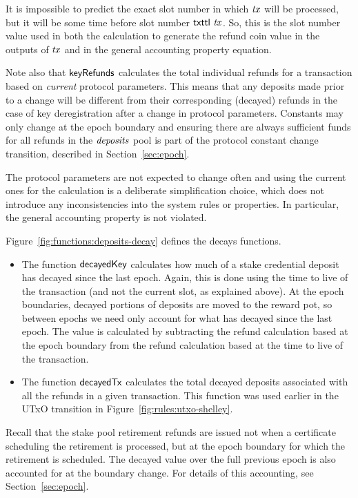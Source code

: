 \begin{itemize}
    It is impossible to predict the exact slot number in which $\mathit{tx}$ will be processed,
    but it will be some time before slot number $\mathsf{txttl}~\mathit{tx}$. So, this is the slot
    number value used in both the calculation to generate the refund coin value in the outputs
    of $\mathit{tx}$ and in the general accounting property equation.

    Note also that
    $\mathsf{keyRefunds}$ calculates the total individual refunds for a transaction
    based on \textit{current} protocol parameters. This means that any deposits
    made prior to a change will be different from their corresponding
    (decayed) refunds in the case of key deregistration after a change in
    protocol parameters. Constants may only change at the epoch boundary and
    ensuring there are always sufficient funds for all
    refunds in the $\mathit{deposits}$ pool is part of the protocol constant
    change transition, described in Section~\ref{sec:epoch}.

    The protocol parameters are not
    expected to change often and using the current ones for the calculation
    is a deliberate simplification choice, which does not introduce any inconsistencies
    into the system rules or properties. In particular, the general accounting
    property is not violated.
\end{itemize}
Figure~\ref{fig:functions:deposits-decay} defines the decays functions.
\begin{itemize}

\item The function $\mathsf{decayedKey}$ calculates how much of a stake credential
  deposit has decayed since the last epoch. Again, this is done using the time
  to live of the transaction (and not the current slot, as explained above).  At
  the epoch boundaries, decayed portions of deposits are moved to the reward
  pot, so between epochs we need only account for what has decayed since the
  last epoch.  The value is calculated by subtracting the refund calculation
  based at the epoch boundary from the refund calculation based at the time to
  live of the transaction.
  \item The function $\mathsf{decayedTx}$ calculates the total decayed deposits associated
    with all the refunds in a given transaction.  This function was used earlier in the
    UTxO transition in Figure~\ref{fig:rules:utxo-shelley}.

\end{itemize}

Recall that the stake pool retirement refunds are issued not when a certificate
scheduling the retirement is processed, but at the epoch boundary for which
the retirement is scheduled. The decayed value over the full previous epoch is
also accounted for at the boundary change. For details of this accounting, see
Section~\ref{sec:epoch}.

